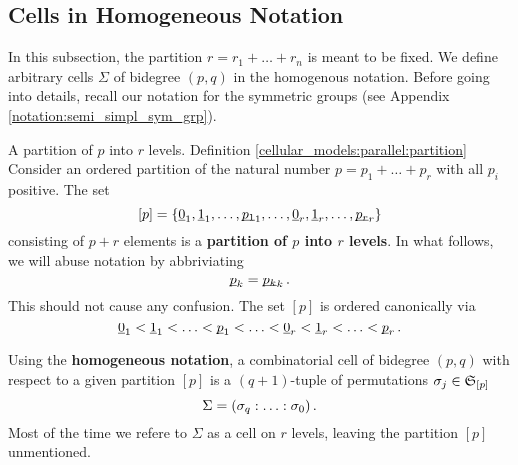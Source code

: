 \subsection{Cells in Homogeneous Notation}
\label{cellular_models:parallel:cells_in_homogenous_notation}
In this subsection, the partition $r = r_1 + \ldots + r_n$ is meant to be fixed.
We define arbitrary cells $\Sigma$ of bidegree $(p,q)$ in the homogenous notation.
Before going into details, recall our notation for the symmetric groups (see Appendix \ref{notation:semi_simpl_sym_grp}).

\begin{defi}
    \label{cellular_models:parallel:partition}
        {A partition of $p$ into $r$ levels.}
        {Definition \ref{cellular_models:parallel:partition}}
    Consider an ordered partition of the natural number $p = p_1+\ldots+p_r$ with all $p_i$ positive.
    The set
    \[
        [p] = \{ \ul 0_1, \ul 1_1, \ldots, \ul{p_1}_1, \ldots, \ul 0_r, \ul 1_r, \ldots, \ul{p_r}_r \}
    \]
    consisting of $p+r$ elements is a {\bfseries partition of $p$ into $r$ levels}.
    In what follows, we will abuse notation by abbriviating
    \[
        \underline{\smash{p}}_k = \underline{\smash{p_k}}_k \,.
    \]
    This should not cause any confusion.
    The set $[p]$ is ordered canonically via
    \[
        \ul0_1 < \ul1_1 < \ldots < \ul p_1 < \ldots < \ul 0_r < \ul 1_r < \ldots < \ul p_r \,.
    \]
\end{defi}

\begin{defi}
    \label{cellular_models:parallel:homogeneous_notation}
    Using the {\bfseries homogeneous notation}, a combinatorial cell of bidegree $(p,q)$ with respect to a given partition $[p]$ is a $(q+1)$-tuple of permutations $\sigma_j \in \mathfrak S_{[p]}$
    \[
        \Sigma = \homogq \,.
    \]
    Most of the time we refere to $\Sigma$ as a cell on $r$ levels, leaving the partition $[p]$ unmentioned.
\end{defi}


